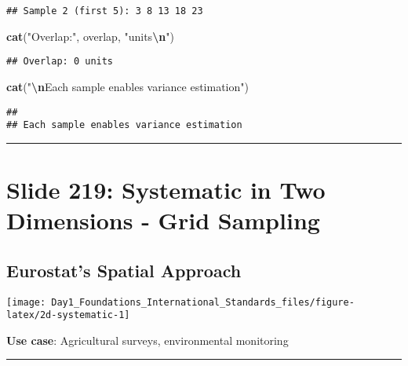 \documentclass[
]{article}
\newenvironment{Shaded}{\begin{snugshade}}{\end{snugshade}}
\newcommand{\FunctionTok}[1]{\textcolor[rgb]{0.13,0.29,0.53}{\textbf{#1}}}
\newcommand{\NormalTok}[1]{#1}
\newcommand{\SpecialCharTok}[1]{\textcolor[rgb]{0.81,0.36,0.00}{\textbf{#1}}}
\newcommand{\StringTok}[1]{\textcolor[rgb]{0.31,0.60,0.02}{#1}}
\begin{document}
\begin{verbatim}
## Sample 2 (first 5): 3 8 13 18 23
\end{verbatim}

\begin{Shaded}
\begin{Highlighting}[]
\FunctionTok{cat}\NormalTok{(}\StringTok{"Overlap:"}\NormalTok{, overlap, }\StringTok{"units}\SpecialCharTok{\textbackslash{}n}\StringTok{"}\NormalTok{)}
\end{Highlighting}
\end{Shaded}

\begin{verbatim}
## Overlap: 0 units
\end{verbatim}

\begin{Shaded}
\begin{Highlighting}[]
\FunctionTok{cat}\NormalTok{(}\StringTok{"}\SpecialCharTok{\textbackslash{}n}\StringTok{Each sample enables variance estimation"}\NormalTok{)}
\end{Highlighting}
\end{Shaded}

\begin{verbatim}
## 
## Each sample enables variance estimation
\end{verbatim}

\begin{center}\rule{0.5\linewidth}{0.5pt}\end{center}

\section{Slide 219: Systematic in Two Dimensions - Grid
Sampling}\label{slide-219-systematic-in-two-dimensions---grid-sampling}

\subsection{Eurostat's Spatial
Approach}\label{eurostats-spatial-approach}

\texttt{[image: Day1\_Foundations\_International\_Standards\_files/figure-latex/2d-systematic-1]}

\textbf{Use case}: Agricultural surveys, environmental monitoring

\begin{center}\rule{0.5\linewidth}{0.5pt}\end{center}
\end{document}
